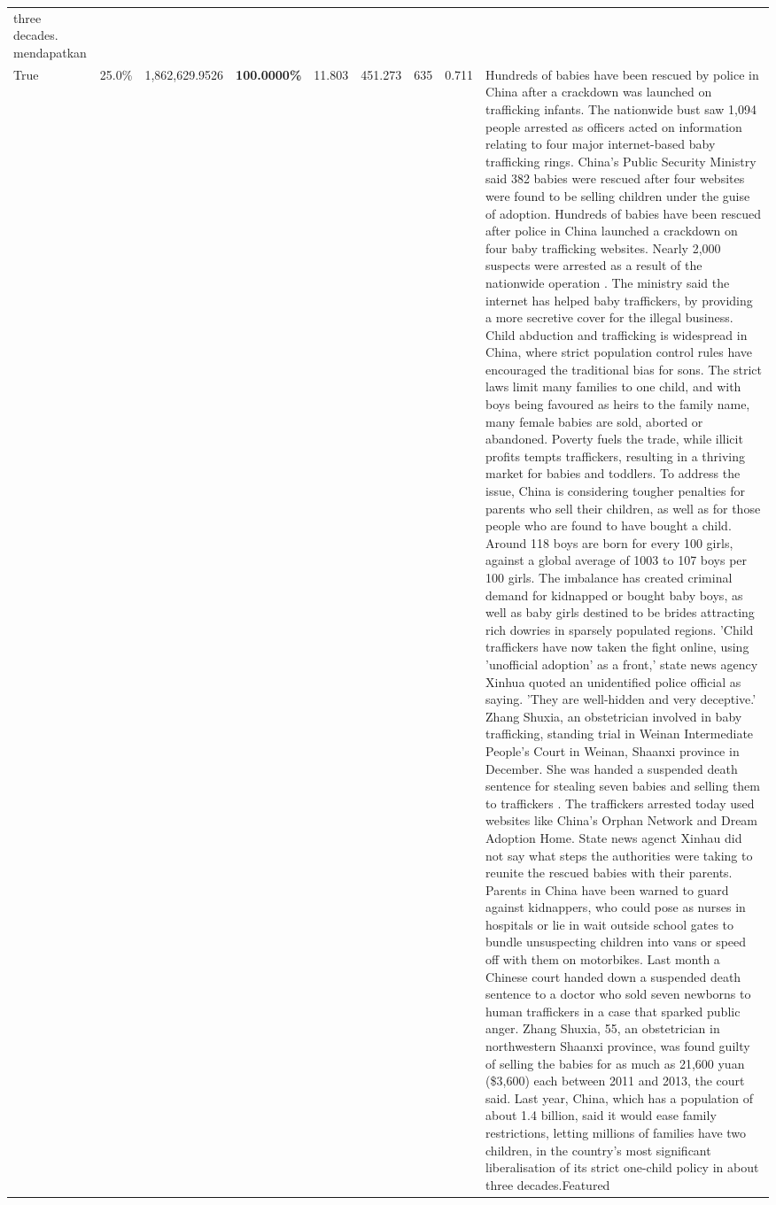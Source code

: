 \begin{table}[H]
\begin{tabular}{lllrlllll}
three decades. mendapatkan \\
\cline{1-9}
True & 25.0\% & 1,862,629.9526 & \bfseries \color{red} 100.0000\% & 11.803 & 451.273 & 635 & 0.711 & Hundreds of babies have been rescued by police in China after a crackdown was launched on trafficking infants. The nationwide bust saw 1,094 people arrested as officers acted on information relating to four major internet-based baby trafficking rings. China's Public Security Ministry said 382 babies were rescued after four websites were found to be selling children under the guise of adoption. Hundreds of babies have been rescued after police in China launched a crackdown on four baby trafficking websites. Nearly 2,000 suspects were arrested as a result of the nationwide operation . The ministry said the internet has helped baby traffickers, by providing a more secretive cover for the illegal business. Child abduction and trafficking is widespread in China, where strict population control rules have encouraged the traditional bias for sons. The strict laws limit many families to one child, and with boys being favoured as heirs to the family name, many female babies are sold, aborted or abandoned. Poverty fuels the trade, while illicit profits tempts traffickers, resulting in a thriving market for babies and toddlers. To address the issue, China is considering tougher penalties for parents who sell their children, as well as for those people who are found to have bought a child. Around 118 boys are born for every 100 girls, against a global average of 1003 to 107 boys per 100 girls. The imbalance has created criminal demand for kidnapped or bought baby boys, as well as baby girls destined to be brides attracting rich dowries in sparsely populated regions. 'Child traffickers have now taken the fight online, using 'unofficial adoption' as a front,' state news agency Xinhua quoted an unidentified police official as saying. 'They are well-hidden and very deceptive.' Zhang Shuxia, an obstetrician involved in baby trafficking, standing trial in Weinan Intermediate People's Court in Weinan, Shaanxi province in December. She was handed a suspended death sentence for stealing seven babies and selling them to traffickers . The traffickers arrested today used websites like China's Orphan Network and Dream Adoption Home. State news agenct Xinhau did not say what steps the authorities were taking to reunite the rescued babies with their parents. Parents in China have been warned to guard against kidnappers, who could pose as nurses in hospitals or lie in wait outside school gates to bundle unsuspecting children into vans or speed off with them on motorbikes. Last month a Chinese court handed down a suspended death sentence to a doctor who sold seven newborns to human traffickers in a case that sparked public anger. Zhang Shuxia, 55, an obstetrician in northwestern Shaanxi province, was found guilty of selling the babies for as much as 21,600 yuan (\$3,600) each between 2011 and 2013, the court said. Last year, China, which has a population of about 1.4 billion, said it would ease family restrictions, letting millions of families have two children, in the country's most significant liberalisation of its strict one-child policy in about three decades.Featured \\

\end{tabular}
\end{table}
